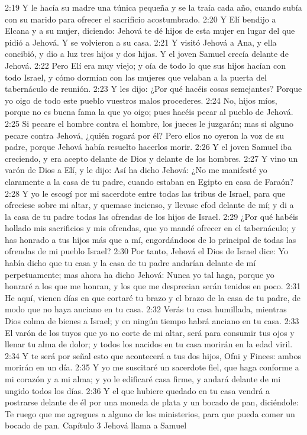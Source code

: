 2:19 Y le hacía su madre una túnica pequeña y se la traía cada año, cuando subía con su marido para ofrecer el sacrificio acostumbrado.  
2:20 Y Elí bendijo a Elcana y a su mujer, diciendo: Jehová te dé hijos de esta mujer en lugar del que pidió a Jehová. Y se volvieron a su casa.  
2:21 Y visitó Jehová a Ana, y ella concibió, y dio a luz tres hijos y dos hijas. Y el joven Samuel crecía delante de Jehová.  
2:22 Pero Elí era muy viejo; y oía de todo lo que sus hijos hacían con todo Israel, y cómo dormían con las mujeres que velaban a la puerta del tabernáculo de reunión.  
2:23 Y les dijo: ¿Por qué hacéis cosas semejantes? Porque yo oigo de todo este pueblo vuestros malos procederes.  
2:24 No, hijos míos, porque no es buena fama la que yo oigo; pues hacéis pecar al pueblo de Jehová.  
2:25 Si pecare el hombre contra el hombre, los jueces le juzgarán; mas si alguno pecare contra Jehová, ¿quién rogará por él? Pero ellos no oyeron la voz de su padre, porque Jehová había resuelto hacerlos morir.  
2:26 Y el joven Samuel iba creciendo, y era acepto delante de Dios y delante de los hombres.  
2:27 Y vino un varón de Dios a Elí, y le dijo: Así ha dicho Jehová: ¿No me manifesté yo claramente a la casa de tu padre, cuando estaban en Egipto en casa de Faraón?  
2:28 Y yo le escogí por mi sacerdote entre todas las tribus de Israel, para que ofreciese sobre mi altar, y quemase incienso, y llevase efod delante de mí; y di a la casa de tu padre todas las ofrendas de los hijos de Israel. 
2:29 ¿Por qué habéis hollado mis sacrificios y mis ofrendas, que yo mandé ofrecer en el tabernáculo; y has honrado a tus hijos más que a mí, engordándoos de lo principal de todas las ofrendas de mi pueblo Israel?  
2:30 Por tanto, Jehová el Dios de Israel dice: Yo había dicho que tu casa y la casa de tu padre andarían delante de mí perpetuamente; mas ahora ha dicho Jehová: Nunca yo tal haga, porque yo honraré a los que me honran, y los que me desprecian serán tenidos en poco.  
2:31 He aquí, vienen días en que cortaré tu brazo y el brazo de la casa de tu padre, de modo que no haya anciano en tu casa.  
2:32 Verás tu casa humillada, mientras Dios colma de bienes a Israel; y en ningún tiempo habrá anciano en tu casa.  
2:33 El varón de los tuyos que yo no corte de mi altar, será para consumir tus ojos y llenar tu alma de dolor; y todos los nacidos en tu casa morirán en la edad viril.  
2:34 Y te será por señal esto que acontecerá a tus dos hijos, Ofni y Finees: ambos morirán en un día.  
2:35 Y yo me suscitaré un sacerdote fiel, que haga conforme a mi corazón y a mi alma; y yo le edificaré casa firme, y andará delante de mi ungido todos los días.  
2:36 Y el que hubiere quedado en tu casa vendrá a postrarse delante de él por una moneda de plata y un bocado de pan, diciéndole: Te ruego que me agregues a alguno de los ministerios, para que pueda comer un bocado de pan.  
Capítulo 3
Jehová llama a Samuel  


